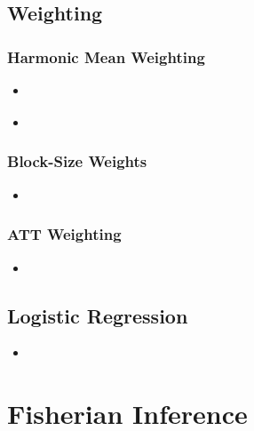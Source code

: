 \documentclass[12pt,leqno]{article}
\theoremstyle{newstyle}
\begin{document}
\subsection{Weighting}

\subsubsection{Harmonic Mean Weighting}

\begin{itemize}

\item \citet[Section 9.3.3]{hansen2011}

\item \citet[Section 2.1]{hansenbowers2008}

\end{itemize}

\subsubsection{Block-Size Weights}

\begin{itemize}

\item \citet[Section 3.6.1]{gerbergreen2012}

\end{itemize}

\subsubsection{ATT Weighting}

\begin{itemize}

\item

\end{itemize}

\subsection{Logistic Regression}

\begin{itemize}

\item \citet{freedman2008b}

\end{itemize}

\section{Fisherian Inference}
\end{document}
